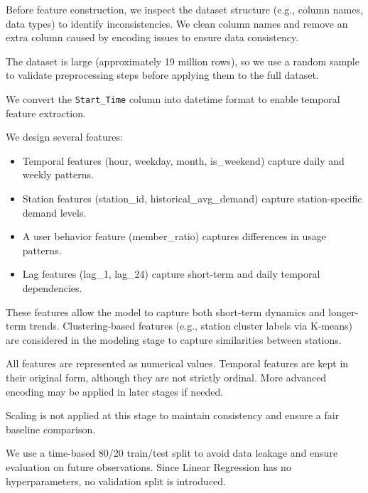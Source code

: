 \documentclass[11pt]{article}
\begin{document}
Before feature construction, we inspect the dataset structure (e.g., column names, data types) to identify inconsistencies. We clean column names and remove an extra column caused by encoding issues to ensure data consistency.

The dataset is large (approximately 19 million rows), so we use a random sample to validate preprocessing steps before applying them to the full dataset.

We convert the \texttt{Start\_Time} column into datetime format to enable temporal feature extraction.

We design several features:

\begin{itemize}
    \item Temporal features (hour, weekday, month, is\_weekend) capture daily and weekly patterns.
    \item Station features (station\_id, historical\_avg\_demand) capture station-specific demand levels.
    \item A user behavior feature (member\_ratio) captures differences in usage patterns.
    \item Lag features (lag\_1, lag\_24) capture short-term and daily temporal dependencies.
\end{itemize}

These features allow the model to capture both short-term dynamics and longer-term trends. Clustering-based features (e.g., station cluster labels via K-means) are considered in the modeling stage to capture similarities between stations.

All features are represented as numerical values. Temporal features are kept in their original form, although they are not strictly ordinal. More advanced encoding may be applied in later stages if needed.

Scaling is not applied at this stage to maintain consistency and ensure a fair baseline comparison.

We use a time-based 80/20 train/test split to avoid data leakage and ensure evaluation on future observations. Since Linear Regression has no hyperparameters, no validation split is introduced.
\end{document}

